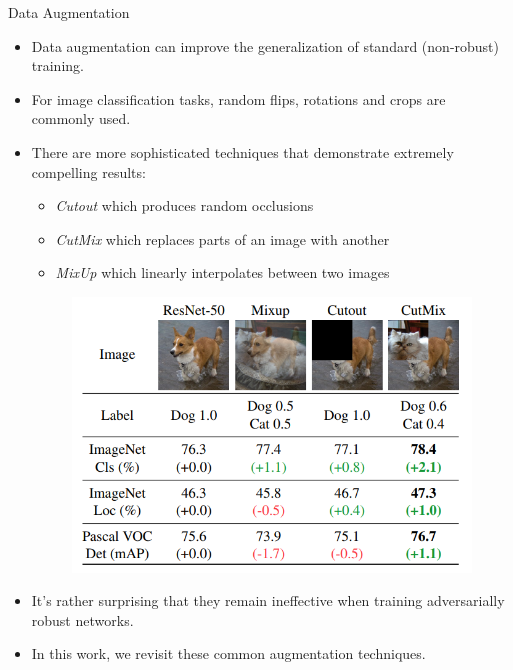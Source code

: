 \begin{frame}{Data Augmentation}
    \begin{itemize}
        \item Data augmentation can improve the generalization of standard (non-robust) training. 
        \item For image classification tasks, random flips, rotations and crops are commonly used. 
        \item There are more sophisticated techniques that demonstrate extremely compelling results: 
            \begin{itemize}
                \item \textit{Cutout} which produces random occlusions
                \item \textit{CutMix} which replaces parts of an image with another
                \item \textit{MixUp} which linearly interpolates between two images
            \end{itemize}
        \begin{figure}
            \centering
            \includegraphics[width=0.5\linewidth]{pic/cutmix.png}
            \label{fig:cutmix}
        \end{figure}
        \item It's rather surprising that they remain ineffective when training adversarially robust networks. 
        \item In this work, we revisit these common augmentation techniques.
    \end{itemize}
\end{frame}

